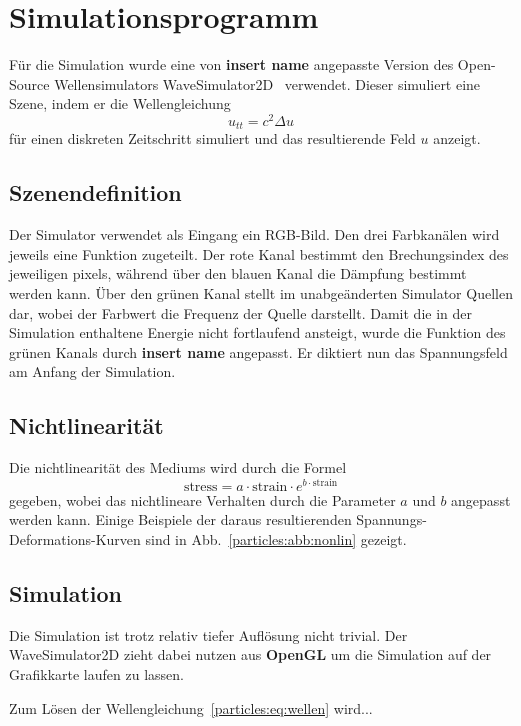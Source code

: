 %
%
%
%
\section{Simulationsprogramm\label{particles:section:simulation}}

Für die Simulation wurde eine von \textbf{insert name} angepasste Version des Open-Source Wellensimulators WaveSimulator2D~\cite{repo:wavesim2d} verwendet. %
Dieser simuliert eine Szene, indem er die Wellengleichung
\[
    u_{tt} = c^2 \Delta u \label{particles:eq:wellen}
\] 
für einen diskreten Zeitschritt simuliert und das resultierende Feld $u$ anzeigt.

\subsection{Szenendefinition}
Der Simulator verwendet als Eingang ein RGB-Bild.
Den drei Farbkanälen wird jeweils eine Funktion zugeteilt.
Der rote Kanal bestimmt den Brechungsindex des jeweiligen pixels, während über den blauen Kanal die Dämpfung bestimmt werden kann.
Über den grünen Kanal stellt im unabgeänderten Simulator Quellen dar, wobei der Farbwert die Frequenz der Quelle darstellt.
Damit die in der Simulation enthaltene Energie nicht fortlaufend ansteigt, wurde die Funktion des grünen Kanals durch \textbf{insert name} angepasst. %
Er diktiert nun das Spannungsfeld am Anfang der Simulation. %

\subsection{Nichtlinearität}
Die nichtlinearität des Mediums wird durch die Formel
\[
    \text{stress} = a \cdot \text{strain} \cdot e^{b \cdot \text{strain}} %
\]
gegeben, wobei das nichtlineare Verhalten durch die Parameter $a$ und $b$ angepasst werden kann.
Einige Beispiele der daraus resultierenden Spannungs-Deformations-Kurven sind in Abb.~\ref{particles:abb:nonlin} gezeigt. %

\subsection{Simulation}
Die Simulation ist trotz relativ tiefer Auflösung nicht trivial. 
Der WaveSimulator2D zieht dabei nutzen aus \textbf{OpenGL} um die Simulation auf der Grafikkarte laufen zu lassen. %

Zum Lösen der Wellengleichung~\ref{particles:eq:wellen} wird... %